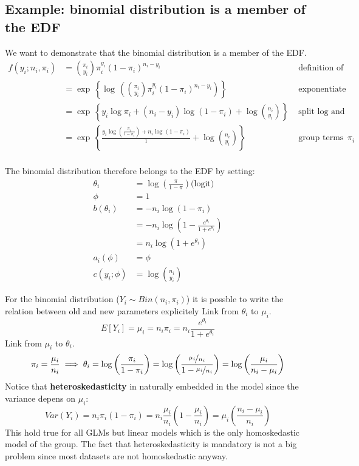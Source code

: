     \subsection{Example: binomial distribution is a member of the EDF}
      We want to demonstrate that the binomial distribution is a member of the EDF.
      \begin{align*}
      f(y_i; n_i, \pi_i)
        &= \binom{\pi_i}{y_i}\pi_i^{y_i}(1-\pi_i)^{n_i-y_i}
        & \text{ definition of binomial distribution}\\
        &= \exp\,\left\{\log\,\left(\binom{\pi_i}{y_i}\pi_i^{y_i}(1-\pi_i)^{n_i-y_i}\right)\right\}
        & \text{ exponentiate to compare with EDF} \\
        &= \exp\,\left\{y_i\log\pi_i+(n_i-y_i)\log(1-\pi_i)+\log\binom{n_i}{y_i}\right\}
        & \text{ split log and simplify}\\
        &= \exp\,\left\{\frac{y_i\log\left(\frac{\pi_i}{1-\pi_i}\right)+n_i\log(1-\pi_i)}{1}+\log\binom{n_i}{y_i}\right\}
        & \text{ group terms containing } \pi_i\\
      \end{align*}
      
      The binomial distribution therefore belongs to the EDF by setting:
      \begin{align*}
        \theta_i     &= \log\left(\frac{\pi}{1-\pi}\right) \text{(logit)} \\
        \phi         &= 1 \\
        b(\theta_i)  &= - n_i \log(1-\pi_i) \\
                     &= -n_i \log(1-\frac{e^{\theta_i}}{1 + e^{\theta_i}}) \\
                     &= n_i \log(1 + e^{\theta_i}) \\
        a_i(\phi)    &= \phi \\
        c(y_i; \phi) &= \log\binom{n_i}{y_i}
      \end{align*}

      For the binomial distribution ($Y_i \sim Bin(n_i, \pi_i)$) it is possble to write the relation between old and new parameters explicitely
      Link from $\theta_i$ to $\mu_i$.
      $$E[Y_i] = \mu_i = n_i\pi_i = n_i\frac{e^{\theta_i}}{1 + e^{\theta_i}}$$
      Link from $\mu_i$ to $\theta_i$.
      $$\pi_i = \frac{\mu_i}{n_i} \implies \theta_i = \log\left(\frac{\pi_i}{1-\pi_i}\right) = \log\left(\frac{\nicefrac{\mu_i}{n_i}}{1-\nicefrac{\mu_i}{n_i}}\right)=\log\left(\frac{\mu_i}{n_i-\mu_i}\right)$$
      Notice that \textbf{heteroskedasticity} in naturally embedded in the model since the variance depens on $\mu_i$:
      $$Var(Y_i) = n_i\pi_i(1-\pi_i) = n_i\frac{\mu_i}{n_i}\left(1-\frac{\mu_i}{n_i}\right) = \mu_i\left(\frac{n_i - \mu_i}{n_i}\right)$$
      This hold true for all GLMs but linear models which is the only homoskedastic model of the group. The fact that heteroskedasticity is mandatory is not a big problem since most datasets are not homoskedastic anyway.

